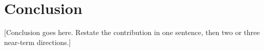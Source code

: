

\section{Conclusion}
\label{sec:conclusion}

[Conclusion goes here. Restate the contribution in one sentence,
then two or three near-term directions.]
